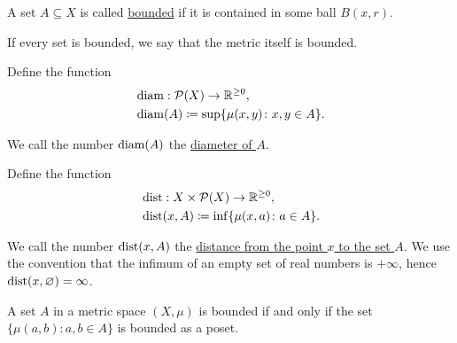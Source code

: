 \begin{definition}
\begin{defenum}
    \item\label{def:metric_space/bounded_set} A set $A \subseteq X$ is called \ul{bounded} if it is contained in some ball $B(x, r)$.

    \item\label{def:metric_space/bounded_metric} If every set is bounded, we say that the metric itself is bounded.

    \item\label{def:metric_space/diameter} Define the function
    \begin{align*}
      &\operatorname{diam}: \operatorname{\mathcal P}(X) \to \mathbb R^{\geq 0}, \\
      &\operatorname{diam}(A) \coloneqq \sup \{ \mu(x, y) \colon x, y \in A \}.
    \end{align*}

    We call the number $\operatorname{diam}(A)$ the \ul{diameter of $A$}.

    \item\label{def:metric_space/distance} Define the function
    \begin{align*}
      &\operatorname{dist}: X \times \operatorname{\mathcal P}(X) \to \mathbb R^{\geq 0}, \\
      &\operatorname{dist}(x, A) \coloneqq \inf \{ \mu(x, a) \colon a \in A \}.
    \end{align*}

    We call the number $\operatorname{dist}(x, A)$ the \ul{distance from the point $x$ to the set $A$}. We use the convention that the infimum of an empty set of real numbers is $+\infty$, hence $\operatorname{dist}(x, \varnothing) = \infty$.
  \end{defenum}
\end{definition}

\begin{note}\label{note:bounded_set_metric_order_equivalence}
  A set $A$ in a metric space $(X, \mu)$ is bounded if and only if the set $\{ \mu(a, b) \colon a, b \in A \}$ is bounded as a poset.
\end{note}

